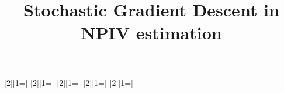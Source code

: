 

\usepackage[nonatbib]{neurips_2023}
\usepackage{global-macros}







\usepackage[T1]{fontenc}    %
\newcommand{\theHalgorithm}{\arabic{algorithm}}
\usepackage[algoruled,boxed,lined]{algorithm2e}
\usepackage{hyperref}       %
\usepackage{url}            %
\usepackage{booktabs}       %
\usepackage{amsfonts}       %
\usepackage{nicefrac}       %
\usepackage{microtype}      %
\usepackage{enumitem}
\usepackage[dvipsnames]{xcolor}         %
\usepackage{biblatex}


\usepackage{xargs}                      %

\usepackage[colorinlistoftodos,prependcaption,textsize=tiny]{todonotes}
[2][1=]{}
[2][1=]{}
[2][1=]{}
[2][1=]{}
[2][1=]{}


\title{Stochastic Gradient Descent in NPIV estimation}


%



